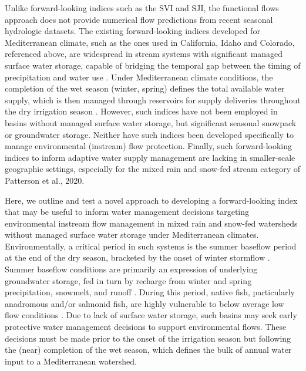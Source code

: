 \documentclass[hess, manuscript]{copernicus}
\begin{document}
Unlike forward-looking indices such as the SVI and SJI, the functional
flows approach \citep[e.g.][]{Yarnell2020} does not provide numerical
flow predictions from recent seasonal hydrologic datasets. The existing
forward-looking indices developed for Mediterranean climate, such as the
ones used in California, Idaho and Colorado, referenced above, are
widespread in stream systems with significant managed surface water
storage, capable of bridging the temporal gap between the timing of
precipitation and water use \citeyearpar[e.g., DWR][]{DWR2023}. Under
Mediterranean climate conditions, the completion of the wet season
(winter, spring) defines the total available water supply, which is then
managed through reservoirs for supply deliveries throughout the dry
irrigation season \citeyearpar[summer and fall, e.g.,
CDWR][]{ColoradoDWR2023}. However, such indices have not been employed
in basins without managed surface water storage, but significant
seasonal snowpack or groundwater storage. Neither have such indices been
developed specifically to manage environmental (instream) flow
protection. Finally, such forward-looking indices to inform adaptive
water supply management are lacking in smaller-scale geographic
settings, especially for the mixed rain and snow-fed stream category of
Patterson et al., 2020.

Here, we outline and test a novel approach to developing a
forward-looking index that may be useful to inform water management
decisions targeting environmental instream flow management in mixed rain
and snow-fed watersheds without managed surface water storage under
Mediterranean climates. Environmentally, a critical period in such
systems is the summer baseflow period at the end of the dry season,
bracketed by the onset of winter stormflow \citep{Peek2022}. Summer
baseflow conditions are primarily an expression of underlying
groundwater storage, fed in turn by recharge from winter and spring
precipitation, snowmelt, and runoff \citep{Tarboton2003}. During this
period, native fish, particularly anadromous and/or salmonid fish, are
highly vulnerable to below average low flow conditions
\citep[e.g.,][]{VanKirk2008a}. Due to lack of surface water storage,
such basins may seek early protective water management decisions to
support environmental flows. These decisions must be made prior to the
onset of the irrigation season but following the (near) completion of
the wet season, which defines the bulk of annual water input to a
Mediterranean watershed.
\end{document}
